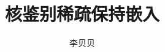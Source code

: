 \documentclass{article}
\title{核鉴别稀疏保持嵌入}
\author{李贝贝}
\date{}
\begin{document}
 \maketitle{}
 
 
 
 
  
 
 \renewcommand\refname{参考文献} 
 
 
 
\end{document}

